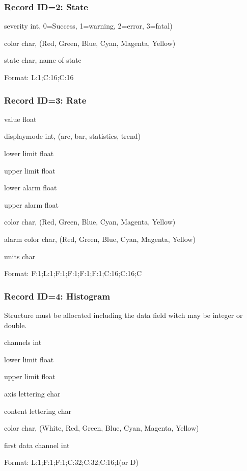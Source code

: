 \subsubsection{Record ID=2: State}
\begin{compactdesc}
\item[severity] int, 0=Success, 1=warning, 2=error, 3=fatal)
\item[color] char, (Red, Green, Blue, Cyan, Magenta, Yellow)
\item[state] char, name of state
\item[Format:] L:1;C:16;C:16
\end{compactdesc}

\subsubsection{Record ID=3: Rate}
\begin{compactdesc}
\item[value]   float 
\item[displaymode ]   int, (arc, bar, statistics, trend)
\item[lower limit]   float 
\item[upper limit]   float 
\item[lower alarm]   float
\item[upper alarm]   float 
\item[color]   char,  (Red, Green, Blue, Cyan, Magenta, Yellow)
\item[alarm color]   char,  (Red, Green, Blue, Cyan, Magenta, Yellow)
\item[units]   char 
\item[Format:] F:1;L:1;F:1;F:1;F:1;F:1;C:16;C:16;C
\end{compactdesc}

\subsubsection{Record ID=4: Histogram}
Structure must be allocated including the data field witch may be integer or double.
\begin{compactdesc}
\item[channels]   int 
\item[lower limit]   float 
\item[upper limit]   float 
\item[axis lettering]   char 
\item[content lettering]   char 
\item[color]   char, (White, Red, Green, Blue, Cyan, Magenta, Yellow)
\item[first data channel]   int 
\item[Format:] L:1;F:1;F:1;C:32;C:32;C:16;I(or D)
\end{compactdesc}

